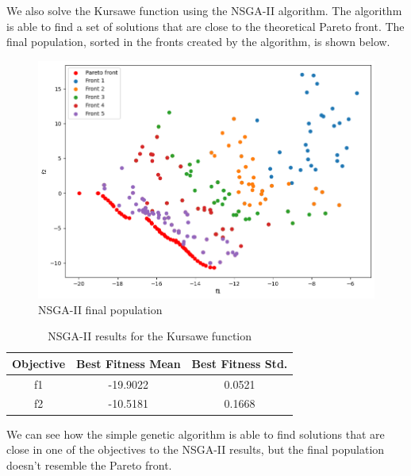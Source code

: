 We also solve the Kursawe function using the NSGA-II algorithm. The algorithm is able to find a set of solutions that are close to the theoretical Pareto front. The final population, sorted in the fronts created by the algorithm, is shown below.
\begin{figure}[H]
    \centering
    \includegraphics[width=\textwidth]{lab8/imgs/kursawe_nsga.png}
    \caption{NSGA-II final population}
    \label{fig:kursawe_nsga}
\end{figure}

\begin{table}[H]
    \centering
    \begin{tabular}{|c|c|c|}
        Objective & Best Fitness Mean & Best Fitness Std. \\ \hline
        f1        & -19.9022          & 0.0521            \\
        f2        & -10.5181          & 0.1668            \\
    \end{tabular}
    \caption{NSGA-II results for the Kursawe function}
    \label{tab:kursawe_nsga}
\end{table}
We can see how the simple genetic algorithm is able to find solutions that are close in one of the objectives to the NSGA-II results, but the final population doesn't resemble the Pareto front.

